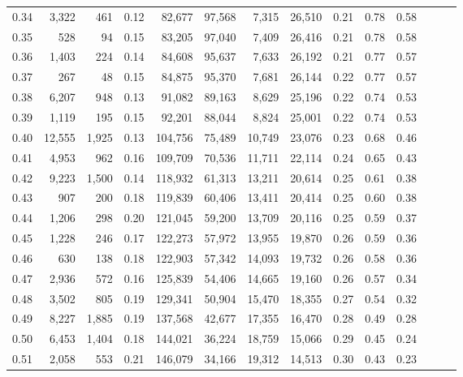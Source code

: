 \begin{tabular}{rrrrrrrrrrrrrr}
0.34 &   3,322 &    461 &  0.12 &   82,677 &   97,568 &   7,315 &  26,510 &  0.21 &  0.78 &      0.58 \\
0.35 &     528 &     94 &  0.15 &   83,205 &   97,040 &   7,409 &  26,416 &  0.21 &  0.78 &      0.58 \\
0.36 &   1,403 &    224 &  0.14 &   84,608 &   95,637 &   7,633 &  26,192 &  0.21 &  0.77 &      0.57 \\
0.37 &     267 &     48 &  0.15 &   84,875 &   95,370 &   7,681 &  26,144 &  0.22 &  0.77 &      0.57 \\
0.38 &   6,207 &    948 &  0.13 &   91,082 &   89,163 &   8,629 &  25,196 &  0.22 &  0.74 &      0.53 \\
0.39 &   1,119 &    195 &  0.15 &   92,201 &   88,044 &   8,824 &  25,001 &  0.22 &  0.74 &      0.53 \\
0.40 &  12,555 &  1,925 &  0.13 &  104,756 &   75,489 &  10,749 &  23,076 &  0.23 &  0.68 &      0.46 \\
0.41 &   4,953 &    962 &  0.16 &  109,709 &   70,536 &  11,711 &  22,114 &  0.24 &  0.65 &      0.43 \\
0.42 &   9,223 &  1,500 &  0.14 &  118,932 &   61,313 &  13,211 &  20,614 &  0.25 &  0.61 &      0.38 \\
0.43 &     907 &    200 &  0.18 &  119,839 &   60,406 &  13,411 &  20,414 &  0.25 &  0.60 &      0.38 \\
0.44 &   1,206 &    298 &  0.20 &  121,045 &   59,200 &  13,709 &  20,116 &  0.25 &  0.59 &      0.37 \\
0.45 &   1,228 &    246 &  0.17 &  122,273 &   57,972 &  13,955 &  19,870 &  0.26 &  0.59 &      0.36 \\
0.46 &     630 &    138 &  0.18 &  122,903 &   57,342 &  14,093 &  19,732 &  0.26 &  0.58 &      0.36 \\
0.47 &   2,936 &    572 &  0.16 &  125,839 &   54,406 &  14,665 &  19,160 &  0.26 &  0.57 &      0.34 \\
0.48 &   3,502 &    805 &  0.19 &  129,341 &   50,904 &  15,470 &  18,355 &  0.27 &  0.54 &      0.32 \\
0.49 &   8,227 &  1,885 &  0.19 &  137,568 &   42,677 &  17,355 &  16,470 &  0.28 &  0.49 &      0.28 \\
0.50 &   6,453 &  1,404 &  0.18 &  144,021 &   36,224 &  18,759 &  15,066 &  0.29 &  0.45 &      0.24 \\
0.51 &   2,058 &    553 &  0.21 &  146,079 &   34,166 &  19,312 &  14,513 &  0.30 &  0.43 &      0.23 \\

\end{tabular}
